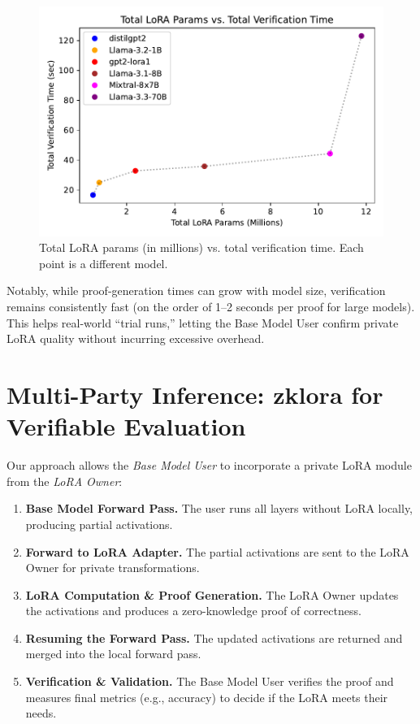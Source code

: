 \documentclass[11pt]{article}
\begin{document}
\begin{figure}[ht]
    \centering
    \includegraphics[width=0.55\linewidth]{figs/fig_verify.pdf}
    \caption{Total LoRA params (in millions) vs. total verification time. Each point is a different model.}
    \label{fig:verify}
\end{figure}

Notably, while proof-generation times can grow with model size, verification remains consistently fast (on the order of 1--2 seconds per proof for large models). This helps real-world “trial runs,” letting the Base Model User confirm private LoRA quality without incurring excessive overhead.

\section{Multi-Party Inference: zklora for Verifiable Evaluation}

Our approach allows the \emph{Base Model User} to incorporate a private LoRA module from the \emph{LoRA Owner}:

\begin{enumerate}
    \item \textbf{Base Model Forward Pass.} 
    The user runs all layers without LoRA locally, producing partial activations.

    \item \textbf{Forward to LoRA Adapter.} 
    The partial activations are sent to the LoRA Owner for private transformations.

    \item \textbf{LoRA Computation \& Proof Generation.} 
    The LoRA Owner updates the activations and produces a zero-knowledge proof of correctness.

    \item \textbf{Resuming the Forward Pass.} 
    The updated activations are returned and merged into the local forward pass.

    \item \textbf{Verification \& Validation.} 
    The Base Model User verifies the proof and measures final metrics (e.g., accuracy) to decide if the LoRA meets their needs.
\end{enumerate}
\end{document}
